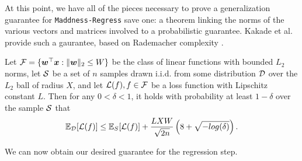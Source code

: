 At this point, we have all of the pieces necessary to prove a generalization guarantee for \texttt{Maddness-Regress} save one: a theorem linking the norms of the various vectors and matrices involved to a probabilistic guarantee. Kakade et al. \cite{kakadeLinear} provide such a gaurantee, based on Rademacher complexity \cite{rademacherOrig}.

\begin{theorem} \label{thm:linearGeneralize}
Let $\mathcal{F} = \{\bm{w}^\top \bm{x} : \lVert\bm{w}\rVert_2 \le W \}$ be the class of linear functions with bounded $L_2$ norms, let $\mathcal{S}$ be a set of $n$ samples drawn i.i.d. from some distribution $\mathcal{D}$ over the $L_2$ ball of radius $X$,
and let $\mathcal{L}(f), f \in \mathcal{F}$ be a loss function with Lipschitz constant $L$. Then for any $0 < \delta < 1$, it holds with probability at least $1 - \delta$  over the sample $\mathcal{S}$ that
\begin{align}
    \mathbb{E}_{\mathcal{D}}[\mathcal{L}(f)] \le \mathbb{E}_S[\mathcal{L}(f)] + \frac{L X W}{\sqrt{2n}} \left( 8 + \sqrt{-log(\delta)} \right) .
\end{align}
\end{theorem}

We can now obtain our desired guarantee for the regression step.

